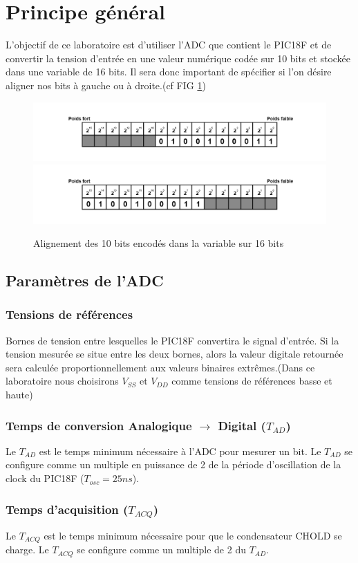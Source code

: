 \section{Principe général}
L'objectif de ce laboratoire est d'utiliser l'ADC que contient le PIC18F et de convertir la tension d'entrée en une valeur numérique codée sur 10 bits et stockée dans une variable de 16 bits. Il sera donc important de spécifier si l'on désire aligner nos bits à gauche ou à droite.(cf FIG \ref{align})

\begin{figure}
\begin{center}
\begin{framed}
\includegraphics[scale=0.8]{images/aligndroite.png}
\includegraphics[scale=0.8]{images/aligngauche.png}
\caption{Alignement des 10 bits encodés dans la variable sur 16 bits}
\label{align}
\end{framed}
\end{center}
\end{figure}

\subsection{Paramètres de l'ADC}

\subsubsection*{Tensions de références}
Bornes de tension entre lesquelles le PIC18F convertira le signal d'entrée. Si la tension mesurée se situe entre les deux bornes, alors la valeur digitale retournée sera calculée proportionnellement aux valeurs binaires extrêmes.(Dans ce laboratoire nous choisirons $V_{SS}$ et $V_{DD}$ comme tensions de références basse et haute)
\subsubsection*{Temps de conversion Analogique $\rightarrow$ Digital  ($T_{AD}$)}
Le $T_{AD}$  est le temps minimum nécessaire à l'ADC pour mesurer un bit. Le $T_{AD}$ se configure comme un multiple en puissance de 2 de la période d'oscillation de la clock du PIC18F ($T_{osc} = 25ns$).
\subsubsection*{Temps d'acquisition ($T_{ACQ}$)}
Le $T_{ACQ}$ est le temps minimum nécessaire pour que le condensateur CHOLD se charge. Le $T_{ACQ}$  se configure comme un multiple de 2 du $T_{AD}$. 
 